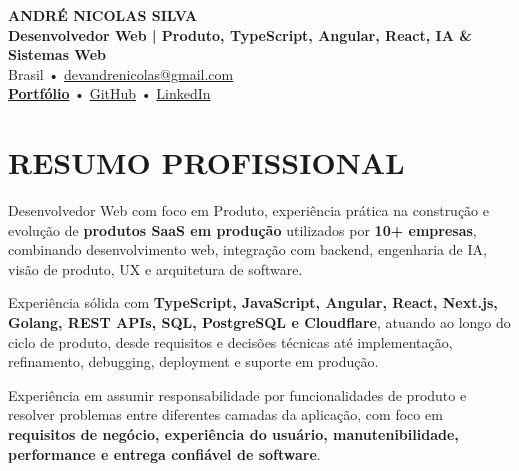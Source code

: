\documentclass[10pt,a4paper]{article}
\begin{document}

\begin{center}

    {\LARGE \textbf{ANDRÉ NICOLAS SILVA}} \\[-2pt]

    {\normalsize \textbf{Desenvolvedor Web | Produto, TypeScript, Angular, React, IA \& Sistemas Web}} \\[1pt]

    \footnotesize
    Brasil \quad • \quad
    \href{mailto:devandrenicolas@gmail.com}{devandrenicolas@gmail.com} \\[-1pt]

    \textbf{\href{https://portfolio-andrenicolas.vercel.app}{Portfólio}}
    \quad • \quad
    \href{https://github.com/devAndreNicolas}{GitHub}
    \quad • \quad
    \href{https://www.linkedin.com/in/devandrenicolas}{LinkedIn}

\end{center}

\vspace{-3pt}


\section*{RESUMO PROFISSIONAL}

\footnotesize

Desenvolvedor Web com foco em Produto, experiência prática na construção e
evolução de \textbf{produtos SaaS em produção} utilizados por
\textbf{10+ empresas}, combinando desenvolvimento web, integração com
backend, engenharia de IA, visão de produto, UX e arquitetura de software.

Experiência sólida com \textbf{TypeScript, JavaScript, Angular, React,
Next.js, Golang, REST APIs, SQL, PostgreSQL e Cloudflare}, atuando ao
longo do ciclo de produto, desde requisitos e decisões técnicas até
implementação, refinamento, debugging, deployment e suporte em produção.

Experiência em assumir responsabilidade por funcionalidades de produto
e resolver problemas entre diferentes camadas da aplicação, com foco em
\textbf{requisitos de negócio, experiência do usuário, manutenibilidade,
performance e entrega confiável de software}.
\end{document}
